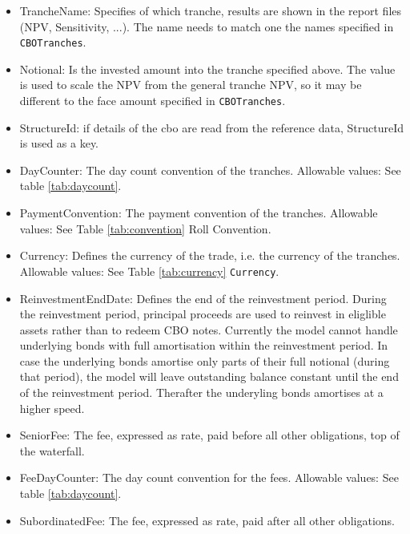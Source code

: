 \begin{itemize}

\item TrancheName: Specifies of which tranche, results are shown in the report files (NPV, Sensitivity, ...). 
The name needs to match one the names specified in {\tt CBOTranches}.

\item Notional: Is the invested amount into the tranche specified above. 
The value is used to scale the NPV from the general tranche NPV, so it may be different to the face amount specified in {\tt CBOTranches}. 

\item StructureId: if details of the cbo are read from the reference data, StructureId is used as a key. 

\item DayCounter: The day count convention of the tranches.
Allowable values: See table \ref{tab:daycount}.

\item PaymentConvention: The payment convention of the tranches.
Allowable values: See Table \ref{tab:convention} Roll Convention.

\item Currency: Defines the currency of the trade, i.e. the currency of the tranches. 
Allowable values: See Table \ref{tab:currency} \lstinline!Currency!.

\item ReinvestmentEndDate: Defines the end of the reinvestment period. 
During the reinvestment period, principal proceeds are used to reinvest in eliglible assets rather than to redeem CBO notes.
Currently the model cannot handle underlying bonds with full amortisation within the reinvestment period. 
In case the underlying bonds amortise only parts of their full notional (during that period), 
the model will leave outstanding balance  constant until the end of the reinvestment period. 
Therafter the underyling bonds amortises at a higher speed. 

\item SeniorFee: The fee, expressed as rate, paid before all other obligations, top of the waterfall.

\item FeeDayCounter: The day count convention for the fees.
Allowable values: See table \ref{tab:daycount}.

\item SubordinatedFee: The fee, expressed as rate, paid after all other obligations.


\end{itemize}
